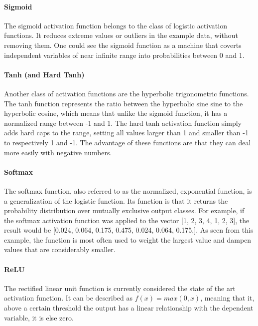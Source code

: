 \paragraph{Sigmoid}
The sigmoid activation function belongs to the class of logistic activation functions. It reduces extreme values or outliers in the example data, without removing them. One could see the sigmoid function as a machine that coverts independent variables of near infinite range into probabilities between 0 and 1.

\paragraph{Tanh (and Hard Tanh)}
Another class of activation functions are the hyperbolic trigonometric functions. The tanh function represents the ratio between the hyperbolic sine sine to the hyperbolic cosine, which means that unlike the sigmoid function, it has a normalized range between -1 and 1. The hard tanh activation function simply adds hard caps to the range, setting all values larger than 1 and smaller than -1 to respectively 1 and -1. The advantage of these functions are that they can deal more easily with negative numbers.

\paragraph{Softmax}
The softmax function, also referred to as the normalized, exponential function, is a generalization of the logistic function. Its function is that it returns the probability distribution over mutually exclusive output classes. For example, if the softmax activation function was applied to the vector [1, 2, 3, 4, 1, 2, 3], the result would be [0.024, 0.064, 0.175, 0.475, 0.024, 0.064, 0.175,]. As seen from this example, the function is most often used to weight the largest value and dampen values that are considerably smaller. 

\paragraph{ReLU}
The rectified linear unit function is currently considered the state of the art activation function. It can be described as $f(x)=max(0,x)$, meaning that it, above a certain threshold the output has a linear relationship with the dependent variable, it is else zero.

